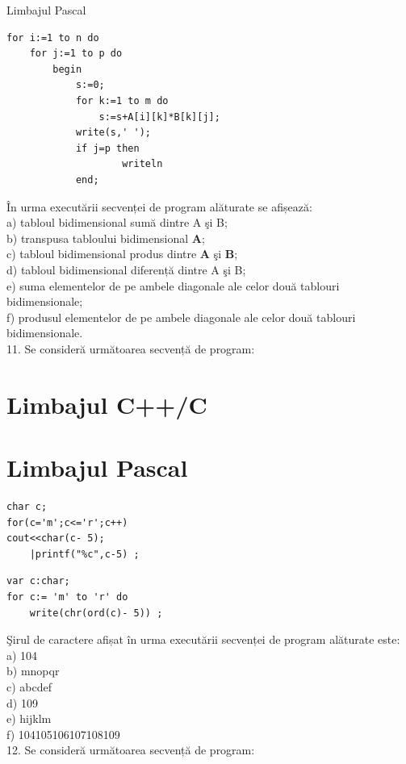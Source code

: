 \documentclass[10pt]{article}
\begin{document}
Limbajul Pascal

\begin{verbatim}
for i:=1 to n do
    for j:=1 to p do
        begin
            s:=0;
            for k:=1 to m do
                s:=s+A[i][k]*B[k][j];
            write(s,' ');
            if j=p then
                    writeln
            end;
\end{verbatim}

În urma executării secvenței de program alăturate se afișează:\\
a) tabloul bidimensional sumă dintre A şi B;\\
b) transpusa tabloului bidimensional $\mathbf{A}$;\\
c) tabloul bidimensional produs dintre $\mathbf{A}$ şi $\mathbf{B}$;\\
d) tabloul bidimensional diferență dintre A şi B;\\
e) suma elementelor de pe ambele diagonale ale celor două tablouri bidimensionale;\\
f) produsul elementelor de pe ambele diagonale ale celor două tablouri bidimensionale.\\
11. Se consideră următoarea secvență de program:

\section*{Limbajul C++/C}
\section*{Limbajul Pascal}
\begin{verbatim}
char c;
for(c='m';c<='r';c++)
cout<<char(c- 5);
    |printf("%c",c-5) ;
\end{verbatim}

\begin{verbatim}
var c:char;
for c:= 'm' to 'r' do
    write(chr(ord(c)- 5)) ;
\end{verbatim}

Şirul de caractere afișat în urma executării secvenței de program alăturate este:\\
a) 104\\
b) mnopqr\\
c) abcdef\\
d) 109\\
e) hijklm\\
f) 104105106107108109\\
12. Se consideră următoarea secvență de program:
\end{document}
